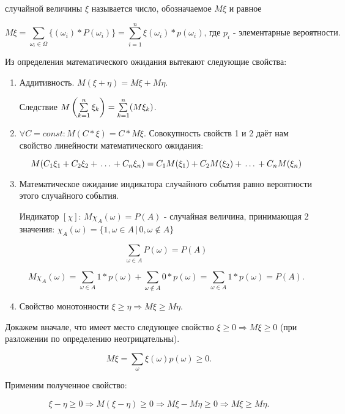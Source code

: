 \documentclass[a4paper,12pt]{report}
\begin{document}
	 случайной величины $\xi$ называется число, обозначаемое $M\xi$ и равное 

	$$
	  M\xi = \sum_{\omega_i \in \Omega}\{(\omega_i)*P(\omega_i)\} 
	       = \sum^n_{i=1}\xi(\omega_i)*p(\omega_i)
	       \mbox{, где $p_i$ - элементарные вероятности.}
	$$

	Из определения математического ожидания вытекают следующие свойства:


	\begin{enumerate}

	\item	Аддитивность. $M(\xi + \eta) = M\xi + M\eta$. 

		Следствие $M\left(\sum\limits^n_{k=1}\strut\xi_k\right)=\sum\limits^n_{k=1}(M\xi_k)$.


	\item	$\forall C = const: M(C*\xi) = C*M\xi$. Совокупность свойств 1 и 2 даёт нам свойство линейности математического ожидания:

	$$
	  M(C_1\xi_1 + C_2\xi_2 + \,\ldots\, + C_n\xi_n) 
	    = C_1M(\xi_1) + C_2M(\xi_2) + \,\ldots\, + C_nM(\xi_n)
	$$


	\item	Математическое ожидание индикатора случайного события равно вероятности этого случайного события. 

	Индикатор $[\chi]$: $M\chi_A (\omega) = P(A)$ - случайная величина, принимающая 2 значения: 
		$
		  \chi_A(\omega) = \{1, \omega \in A \,|\, 0, \omega \not\in A\}
		$

		$$
		  \sum_{\omega \in A}P(\omega) = P(A)
		$$

		$$
		  M\chi_A(\omega) = \sum_{\omega \in A}1*p(\omega) + \sum_{\omega \not\in A}0*p(\omega)
		                  = \sum_{\omega \in A}1*p(\omega) = P(A).
		$$

	
	\item	Свойство монотонности $\xi \geqslant \eta \Rightarrow M\xi \geqslant M\eta$.

	\end{enumerate}


	Докажем вначале, что имеет место следующее свойство $\xi \geqslant 0 \Rightarrow M\xi \geqslant 0$ (при разложении по определению неотрицательны).

	$$
	  M\xi = \sum_\omega\xi(\omega)p(\omega) \geqslant 0.
	$$
	
	Применим полученное свойство:

	$$
	  \xi - \eta \ge 0 \Rightarrow 
	   M(\xi - \eta) \ge 0 \Rightarrow 
	   M\xi - M\eta \ge 0 \Rightarrow 
	   M\xi \ge M\eta.
	$$
\end{document}
